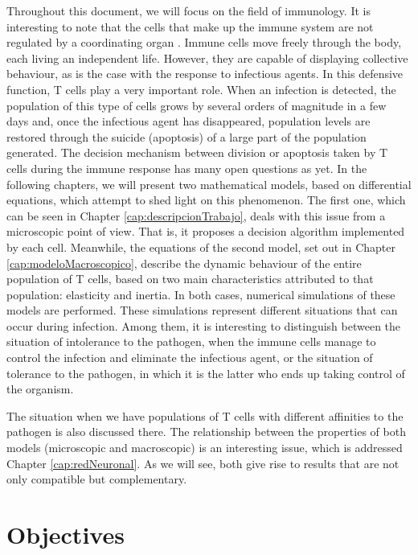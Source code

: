 Throughout this document, we will focus on the field of immunology. It is interesting to note that the cells that make up the immune system are not regulated by a coordinating organ \citep{arias2016emergent}. Immune cells move freely through the body, each living an independent life. However, they are capable of displaying collective behaviour, as is the case with the response to infectious agents. In this defensive function, T cells play a very important role. When an infection is detected, the population of this type of cells grows by several orders of magnitude in a few days and, once the infectious agent has disappeared, population levels are restored through the suicide (apoptosis) of a large part of the population generated. The decision mechanism between division or apoptosis taken by T cells during the immune response has many open questions as yet. In the following chapters, we will present two mathematical models, based on differential equations, which attempt to shed light on this phenomenon. The first one, which can be seen in Chapter \ref{cap:descripcionTrabajo}, deals with this issue from a microscopic point of view. That is, it proposes a decision algorithm implemented by each cell. Meanwhile, the equations of the second model, set out in Chapter \ref{cap:modeloMacroscopico}, describe the dynamic behaviour of the entire population of T cells, based on two main characteristics attributed to that population: elasticity and inertia. In both cases, numerical simulations of these models are performed. These simulations represent different situations that can occur during infection. Among them, it is interesting to distinguish between the situation of intolerance to the pathogen, when the immune cells manage to control the infection and eliminate the infectious agent, or the situation of tolerance to the pathogen, in which it is the latter who ends up taking control of the organism. 

The situation when we have populations of T cells with different affinities to the pathogen is also discussed there. The relationship between the properties of both models (microscopic and macroscopic) is an interesting issue, which is addressed Chapter \ref{cap:redNeuronal}. As we will see, both give rise to results that are not only compatible but complementary. 



\section{Objectives}


